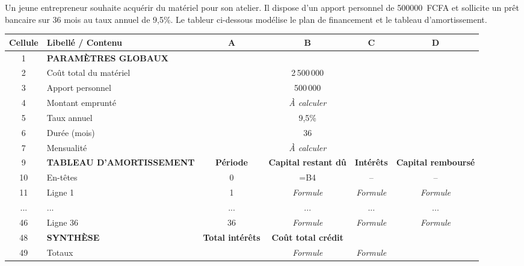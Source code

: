 \documentclass[11pt]{article}
\begin{document}
\begin{exercice}
Un jeune entrepreneur souhaite acquérir du matériel pour son atelier. Il dispose d'un apport personnel de \SI{500 000}{FCFA} et sollicite un prêt bancaire sur 36 mois au taux annuel de 9,5\%. Le tableur ci-dessous modélise le plan de financement et le tableau d'amortissement.

\begin{tabular}{|c|l|c|c|c|c|}
\hline
\textbf{Cellule} & \textbf{Libellé / Contenu} & \textbf{A} & \textbf{B} & \textbf{C} & \textbf{D} \\
\hline
1 & \textbf{PARAMÈTRES GLOBAUX} & & & & \\
2 & Coût total du matériel & & 2\,500\,000 & & \\
3 & Apport personnel & & 500\,000 & & \\
4 & Montant emprunté & & \textit{À calculer} & & \\
5 & Taux annuel & & 9,5\% & & \\
6 & Durée (mois) & & 36 & & \\
7 & Mensualité & & \textit{À calculer} & & \\
\hline
9 & \textbf{TABLEAU D'AMORTISSEMENT} & \textbf{Période} & \textbf{Capital restant dû} & \textbf{Intérêts} & \textbf{Capital remboursé} \\
10 & En-têtes & 0 & =B4 & -- & -- \\
11 & Ligne 1 & 1 & \textit{Formule} & \textit{Formule} & \textit{Formule} \\
... & ... & ... & ... & ... & ... \\
46 & Ligne 36 & 36 & \textit{Formule} & \textit{Formule} & \textit{Formule} \\
\hline
48 & \textbf{SYNTHÈSE} & \textbf{Total intérêts} & \textbf{Coût total crédit} & & \\
49 & Totaux & & \textit{Formule} & \textit{Formule} & \\
\hline
\end{tabular}


\end{exercice}
\end{document}
